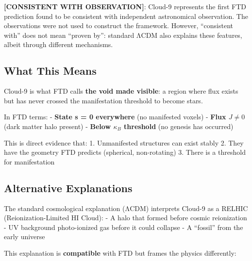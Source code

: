 \documentclass[
  11pt,
  letterpaper,
  twoside,
  openright]{book}
\begin{document}
\begin{tcolorbox}[enhanced jigsaw, coltitle=black, colbacktitle=quarto-callout-note-color!10!white, toprule=.15mm, colframe=quarto-callout-note-color-frame, arc=.35mm, opacityback=0, bottomtitle=1mm, toptitle=1mm, breakable, colback=white, titlerule=0mm, opacitybacktitle=0.6, title=\textcolor{quarto-callout-note-color}{\faInfo}\hspace{0.5em}{Epistemic Status}, rightrule=.15mm, bottomrule=.15mm, leftrule=.75mm, left=2mm]

\textbf{{[}CONSISTENT WITH OBSERVATION{]}}: Cloud-9 represents the first
FTD prediction found to be consistent with independent astronomical
observation. The observations were not used to construct the framework.
However, ``consistent with'' does not mean ``proven by'': standard ΛCDM
also explains these features, albeit through different mechanisms.

\end{tcolorbox}

\subsection{What This Means}\label{what-this-means}

Cloud-9 is what FTD calls \textbf{the void made visible}: a region where
flux exists but has never crossed the manifestation threshold to become
stars.

In FTD terms: - \textbf{State s = 0 everywhere} (no manifested voxels) -
\textbf{Flux \(J \neq 0\)} (dark matter halo present) - \textbf{Below
\(\kappa_B\) threshold} (no genesis has occurred)

This is direct evidence that: 1. Unmanifested structures can exist
stably 2. They have the geometry FTD predicts (spherical, non-rotating)
3. There is a threshold for manifestation

\subsection{Alternative Explanations}\label{alternative-explanations}

The standard cosmological explanation (ΛCDM) interprets Cloud-9 as a
RELHIC (Reionization-Limited HI Cloud): - A halo that formed before
cosmic reionization - UV background photo-ionized gas before it could
collapse - A ``fossil'' from the early universe

This explanation is \textbf{compatible} with FTD but frames the physics
differently:
\end{document}
